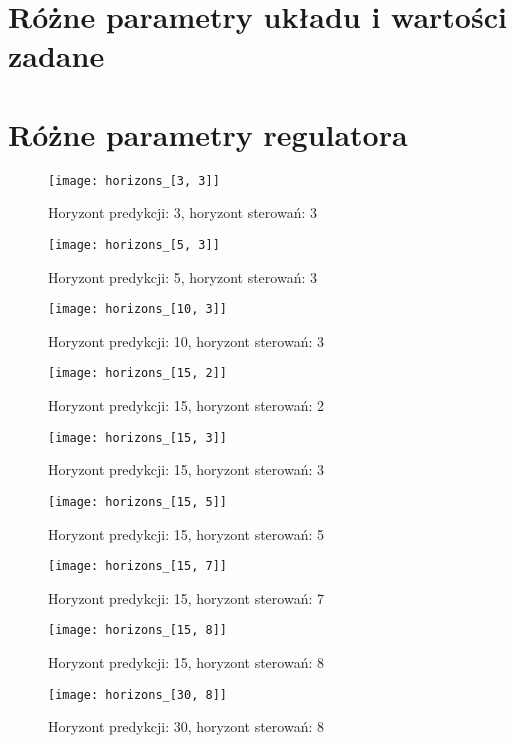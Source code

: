 \section{Różne parametry układu i wartości zadane}

\section{Różne parametry regulatora}

\begin{figure}[p]
    \centering
	\texttt{[image: horizons\_[3, 3]]}
	\caption{Horyzont predykcji: 3, horyzont sterowań: 3}
	\label{fig:horizons_3_3}
\end{figure}

\begin{figure}[p]
    \centering
	\texttt{[image: horizons\_[5, 3]]}
	\caption{Horyzont predykcji: 5, horyzont sterowań: 3}
	\label{fig:horizons_5_3}
\end{figure}

\begin{figure}[p]
    \centering
	\texttt{[image: horizons\_[10, 3]]}
	\caption{Horyzont predykcji: 10, horyzont sterowań: 3}
	\label{fig:horizons_10_3}
\end{figure}

\begin{figure}[p]
    \centering
	\texttt{[image: horizons\_[15, 2]]}
	\caption{Horyzont predykcji: 15, horyzont sterowań: 2}
	\label{fig:horizons_15_2}
\end{figure}

\begin{figure}[p]
    \centering
	\texttt{[image: horizons\_[15, 3]]}
	\caption{Horyzont predykcji: 15, horyzont sterowań: 3}
	\label{fig:horizons_15_3}
\end{figure}

\begin{figure}[p]
    \centering
	\texttt{[image: horizons\_[15, 5]]}
	\caption{Horyzont predykcji: 15, horyzont sterowań: 5}
	\label{fig:horizons_15_5}
\end{figure}

\begin{figure}[p]
    \centering
	\texttt{[image: horizons\_[15, 7]]}
	\caption{Horyzont predykcji: 15, horyzont sterowań: 7}
	\label{fig:horizons_15_7}
\end{figure}

\begin{figure}[p]
    \centering
	\texttt{[image: horizons\_[15, 8]]}
	\caption{Horyzont predykcji: 15, horyzont sterowań: 8}
	\label{fig:horizons_15_8}
\end{figure}

\begin{figure}[p]
    \centering
	\texttt{[image: horizons\_[30, 8]]}
	\caption{Horyzont predykcji: 30, horyzont sterowań: 8}
	\label{fig:horizons_30_8}
\end{figure}